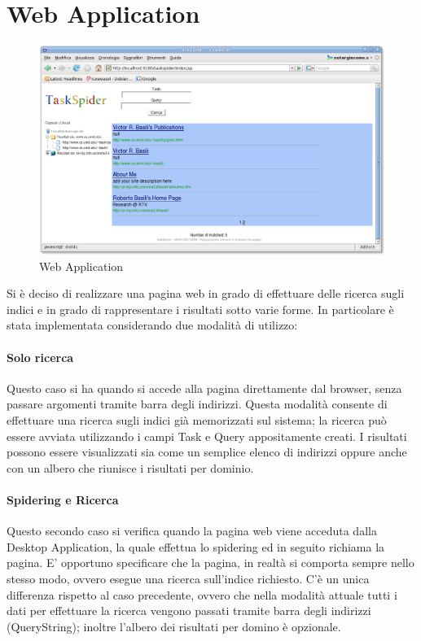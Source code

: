 \section{Web Application}
\begin{figure}[htb]
\begin{center}
\includegraphics[scale=0.35]{etc/webApp.png}
\caption{Web Application}
\label{webApp}
\end{center}
\end{figure}
Si è deciso di realizzare una pagina web in grado di effettuare delle ricerca sugli indici e in grado di rappresentare i risultati sotto varie forme. In particolare è stata implementata considerando due modalità di utilizzo:
\paragraph{Solo ricerca}
Questo caso si ha quando si accede alla pagina direttamente dal browser, senza passare argomenti tramite barra degli indirizzi. Questa modalità consente di effettuare una ricerca sugli indici già memorizzati sul sistema; la ricerca può essere avviata utilizzando i campi Task e Query appositamente creati. I risultati possono essere visualizzati sia come un semplice elenco di indirizzi oppure anche con un albero che riunisce i risultati per dominio.
\paragraph{Spidering e Ricerca}
Questo secondo caso si verifica quando la pagina web viene acceduta dalla Desktop Application, la quale effettua lo spidering ed in seguito richiama la pagina. E' opportuno specificare che la pagina, in realtà si comporta sempre nello stesso modo, ovvero esegue una ricerca sull'indice richiesto. C'è un unica differenza rispetto al caso precedente, ovvero che nella modalità attuale tutti i dati per effettuare la ricerca vengono passati tramite barra degli indirizzi (QueryString); inoltre l'albero dei risultati per domino è opzionale.